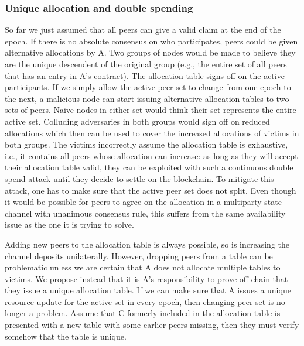 \subsubsection{Unique allocation and double spending}

So far we just assumed that all peers can give a valid claim at the end of the epoch. 
If there is no absolute consensus on who participates, peers could be given alternative allocations by A. Two groups of nodes would be made to believe they are the unique descendent of the original group (e.g., the entire set of all peers that has an entry in A's contract). The allocation table signs off on the active participants.
If we simply allow the active peer set to change from one epoch to the next, a malicious node can start issuing alternative allocation tables to two sets of peers. Naive nodes in either set would think their set represents the entire active set. Colluding adversaries in both groups would sign off on reduced allocations which then can be used to cover the increased allocations of victims in both groups. The victims incorrectly assume the allocation table is exhaustive, i.e., it contains all peers whose allocation can increase: as long as they will accept their allocation table valid, they can be exploited with such a continuous double spend attack until they decide to settle on the blockchain. To mitigate this attack, one has to make sure that the active peer set does not split. Even though it would be possible for peers to agree on the allocation in a multiparty state channel with unanimous consensus rule, this suffers from the same availability issue as the one it is trying to solve.

Adding new peers to the allocation table is always possible, so is increasing the channel deposits unilaterally. However, dropping peers from a table can be problematic unless we are certain that A does not allocate multiple tables to victims.
We propose instead that it is A's responsibility to prove off-chain that they issue a unique allocation table. 
If we can make sure that A issues a unique resource update for the active set in every epoch, then changing peer set is no longer a problem. 
Assume that C formerly included in the allocation table is presented with a new table with some earlier peers missing, then they must verify somehow that the table is unique. 

